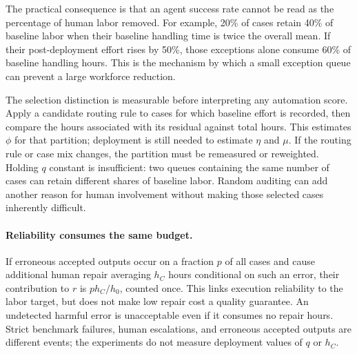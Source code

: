 The practical consequence is that an agent success rate cannot be read as the percentage
of human labor removed. For example, 20\% of cases retain 40\% of baseline labor when their
baseline handling time is twice the overall mean. If their post-deployment effort rises by
50\%, those exceptions alone consume 60\% of baseline handling hours. This is the
mechanism by which a small exception queue can prevent a large workforce reduction.

The selection distinction is measurable before interpreting any automation score. Apply a
candidate routing rule to cases for which baseline effort is recorded, then compare the
hours associated with its residual against total hours. This estimates $\phi$ for that
partition; deployment is still needed to estimate $\eta$ and $\mu$. If the routing rule or
case mix changes, the partition must be remeasured or reweighted. Holding $q$ constant is
insufficient: two queues containing the same number of cases can retain different shares
of baseline labor. Random auditing can add another reason for human involvement without
making those selected cases inherently difficult.

\paragraph{Reliability consumes the same budget.}
If erroneous accepted outputs occur on a fraction $p$ of all cases and cause additional human
repair averaging $h_C$ hours conditional on such an error, their contribution to $r$ is
$p h_C/h_0$, counted once.
This links execution reliability to the labor target, but does not make low repair cost a
quality guarantee. An undetected harmful error is unacceptable even if it consumes no repair
hours. Strict benchmark failures, human escalations, and erroneous accepted outputs are
different events; the experiments do not measure deployment values of $q$ or $h_C$.

